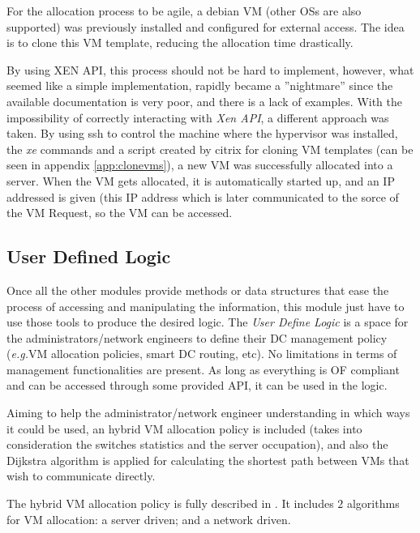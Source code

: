 \documentclass[12pt,english,oneside]{book}
\begin{document}
For the allocation process to be agile, a debian VM (other OSs are also supported) was previously installed and configured for external access. The idea is to clone this VM template, reducing the allocation time drastically.

By using XEN API, this process should not be hard to implement, however, what seemed like a simple implementation, rapidly became a ''nightmare'' since the available documentation is very poor, and there is a lack of examples.
With the impossibility of correctly interacting with \textit{Xen API}, a different approach was taken. By using ssh to control the machine where the hypervisor was installed, the \textit{xe} commands and a script created by citrix for cloning VM templates (can be seen in appendix \ref{app:clonevms}), a new VM was successfully allocated into a server.
When the VM gets allocated, it is automatically started up, and an IP addressed is given (this IP address which is later communicated to the sorce of the VM Request, so the VM can be accessed.

\subsection{User Defined Logic}
\hspace{0.6cm}

Once all the other modules provide methods or data structures that ease the process of accessing and manipulating the information, this module just have to use those tools to produce the desired logic.
The \textit{User Define Logic} is a space for the administrators/network engineers to define their DC management policy (\textit{e.g.}VM allocation policies, smart DC routing, etc).
No limitations in terms of management functionalities are present. As long as everything is OF compliant and can be accessed through some provided API, it can be used in the logic.

Aiming to help the administrator/network engineer understanding in which ways it could be used, an hybrid VM allocation policy is included (takes into consideration the switches statistics and the server occupation), and also the Dijkstra algorithm is applied for calculating the shortest path between VMs that wish to communicate directly.

The hybrid VM allocation policy is fully described in \cite{im2013}. It includes $2$ algorithms for VM allocation: a server driven; and a network driven.
\end{document}
